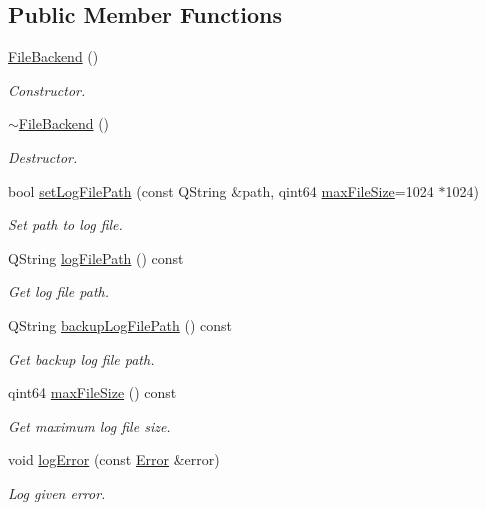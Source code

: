 \subsection*{Public Member Functions}
\begin{DoxyCompactItemize}
\item 
\hyperlink{class_mdt_1_1_error_logger_1_1_file_backend_a8587ac2a6cd89416878b389138e79a3a}{File\+Backend} ()
\begin{DoxyCompactList}\small\item\em Constructor. \end{DoxyCompactList}\item 
\hyperlink{class_mdt_1_1_error_logger_1_1_file_backend_a5f7262e481d756d7145bbfa42aeca91e}{$\sim$\+File\+Backend} ()
\begin{DoxyCompactList}\small\item\em Destructor. \end{DoxyCompactList}\item 
bool \hyperlink{class_mdt_1_1_error_logger_1_1_file_backend_a844fc6f89a147b0713700028808e364a}{set\+Log\+File\+Path} (const Q\+String \&path, qint64 \hyperlink{class_mdt_1_1_error_logger_1_1_file_backend_a8c5943cdd59ed5941c72490d7b414359}{max\+File\+Size}=1024 $\ast$1024)
\begin{DoxyCompactList}\small\item\em Set path to log file. \end{DoxyCompactList}\item 
Q\+String \hyperlink{class_mdt_1_1_error_logger_1_1_file_backend_ac25cd41dbbe940bf0247e5054ce8805e}{log\+File\+Path} () const 
\begin{DoxyCompactList}\small\item\em Get log file path. \end{DoxyCompactList}\item 
Q\+String \hyperlink{class_mdt_1_1_error_logger_1_1_file_backend_a7c79c940be2f03f22111638d2e749a64}{backup\+Log\+File\+Path} () const 
\begin{DoxyCompactList}\small\item\em Get backup log file path. \end{DoxyCompactList}\item 
qint64 \hyperlink{class_mdt_1_1_error_logger_1_1_file_backend_a8c5943cdd59ed5941c72490d7b414359}{max\+File\+Size} () const 
\begin{DoxyCompactList}\small\item\em Get maximum log file size. \end{DoxyCompactList}\item 
void \hyperlink{class_mdt_1_1_error_logger_1_1_file_backend_a31b8314d523a491b5441276122daed87}{log\+Error} (const \hyperlink{class_mdt_1_1_error}{Error} \&error)
\begin{DoxyCompactList}\small\item\em Log given error. \end{DoxyCompactList}\end{DoxyCompactItemize}
